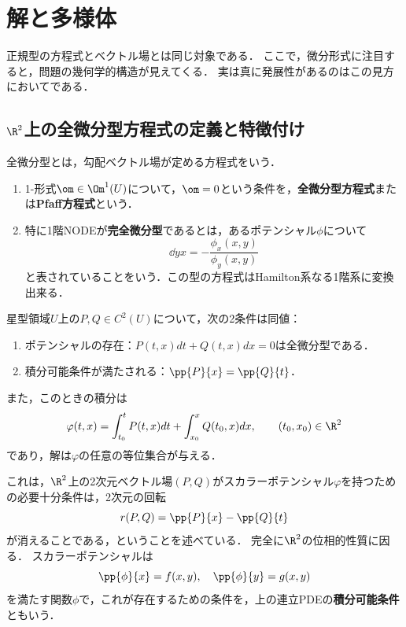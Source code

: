 \documentclass[uplatex,dvipdfmx]{jsreport}
\begin{document}
\section{解と多様体}

\begin{tcolorbox}[colframe=ForestGreen, colback=ForestGreen!10!white,breakable,colbacktitle=ForestGreen!40!white,coltitle=black,fonttitle=\bfseries\sffamily,
title=]
    正規型の方程式とベクトル場とは同じ対象である．
    ここで，微分形式に注目すると，問題の幾何学的構造が見えてくる．
    実は真に発展性があるのはこの見方においてである．
\end{tcolorbox}

\subsection{$\R^2$上の全微分型方程式の定義と特徴付け}

\begin{tcolorbox}[colframe=ForestGreen, colback=ForestGreen!10!white,breakable,colbacktitle=ForestGreen!40!white,coltitle=black,fonttitle=\bfseries\sffamily,
title=]
    全微分型とは，勾配ベクトル場が定める方程式をいう．
\end{tcolorbox}

\begin{definition}\mbox{}
    \begin{enumerate}
        \item 1-形式$\om\in\Om^1(U)$について，$\om=0$という条件を，\textbf{全微分型方程式}または\textbf{Pfaff方程式}という．
        \item 特に1階NODEが\textbf{完全微分型}であるとは，あるポテンシャル$\phi$について
        \[\dd{y}{x}=-\frac{\phi_x(x,y)}{\phi_y(x,y)}\]
        と表されていることをいう．この型の方程式はHamilton系なる1階系に変換出来る．
    \end{enumerate}
\end{definition}

\begin{theorem}[Euclid空間上の全微分型方程式の特徴付け]
    星型領域$U$上の$P,Q\in C^2(U)$について，次の2条件は同値：
    \begin{enumerate}
        \item ポテンシャルの存在：$P(t,x)dt+Q(t,x)dx=0$は全微分型である．
        \item 積分可能条件が満たされる：$\pp{P}{x}=\pp{Q}{t}$．
    \end{enumerate}
    また，このときの積分は
    \[\varphi(t,x)=\int^t_{t_0}P(t,x)dt+\int^x_{x_0}Q(t_0,x)dx,\qquad(t_0,x_0)\in\R^2\]
    であり，解は$\varphi$の任意の等位集合が与える．
\end{theorem}
\begin{remark}[ポテンシャルの存在条件]
    これは，$\R^2$上の2次元ベクトル場$(P,Q)$がスカラーポテンシャル$\varphi$を持つための必要十分条件は，2次元の回転
    \[r(P,Q)=\pp{P}{x}-\pp{Q}{t}\]
    が消えることである，ということを述べている．
    完全に$\R^2$の位相的性質に因る．
    スカラーポテンシャルは
    \[\pp{\phi}{x}=f(x,y),\quad\pp{\phi}{y}=g(x,y)\]
    を満たす関数$\phi$で，これが存在するための条件を，上の連立PDEの\textbf{積分可能条件}ともいう．
\end{remark}
\end{document}
